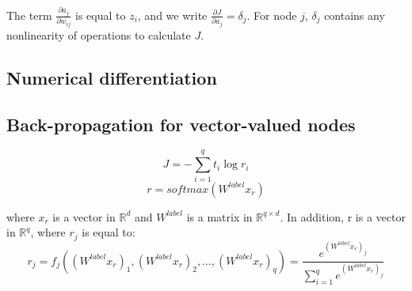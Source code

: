 \documentclass[twoside,12pt]{article}
\begin{document}
The term $\frac{\partial a_j}{\partial w_{ij}}$ is equal to $z_i$, and we write $\frac{\partial J}{\partial a_j}=\delta_j$. For node $j$, $\delta_j$ contains any nonlinearity of operations to calculate $J$. 


 

\subsection{Numerical differentiation}
\subsection{Back-propagation for vector-valued nodes}
\begin{equation}
J = -\sum_{i=1}^{q}t_i\log{r_i}
\end{equation}
\begin{equation}
r = softmax(W^{label}x_r)
\end{equation}

where $x_r$ is a vector in $\mathbb{R}^d$ and $W^{label}$ is a matrix in $\mathbb{R}^{q\times d}$. In addition, r is a vector in $\mathbb{R}^q$, where $r_j$ is equal to:
\begin{equation}
r_j=f_j((W^{label}x_r)_1,(W^{label}x_r)_2,\ldots,(W^{label}x_r)_q)=\frac{e^{(W^{label}x_r)_j}}{\sum_{i=1}^{q}e^{(W^{label}x_r)_j}}
\end{equation}
\end{document}
